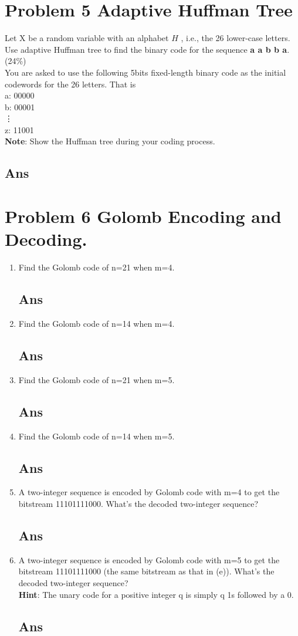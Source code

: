 \documentclass[a4paper, 11pt]{article}
\begin{document}
\section*{Problem 5 Adaptive Huffman Tree}
Let X be a random variable with an alphabet $H$ , i.e., the 26 lower-case letters.
Use adaptive Huffman tree to find the binary code for the sequence \textbf{a a b b a}.
(24\%) \\
You are asked to use the following 5bits fixed-length binary code as the initial codewords for
the 26 letters. That is \\
a: 00000 \\
b: 00001 \\
\vdots \\
z: 11001 \\
\textbf{Note}: Show the Huffman tree during your coding process.
\subsection*{Ans}
\section*{Problem 6 Golomb Encoding and Decoding.}
\begin{enumerate}[label=(\alph*)]
  \item Find the Golomb code of n=21 when m=4.
  \subsection*{Ans}
  \item Find the Golomb code of n=14 when m=4.
  \subsection*{Ans}
  \item Find the Golomb code of n=21 when m=5.
  \subsection*{Ans}
  \item Find the Golomb code of n=14 when m=5.
  \subsection*{Ans}
  \item A two-integer sequence is encoded by Golomb code with m=4 to get the bitstream
  11101111000. What’s the decoded two-integer sequence?
  \subsection*{Ans}
  \item A two-integer sequence is encoded by Golomb code with m=5 to get the bitstream
  11101111000 (the same bitstream as that in (e)). What’s the decoded two-integer sequence?\\
  \textbf{Hint}: The unary code for a positive integer q is simply q 1s followed by a 0.
  \subsection*{Ans}
\end{enumerate}
\end{document}
